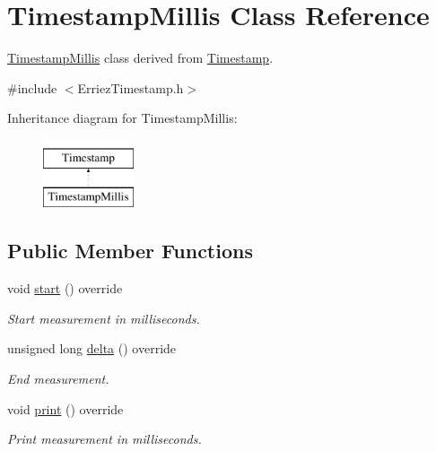 \hypertarget{class_timestamp_millis}{}\section{Timestamp\+Millis Class Reference}
\label{class_timestamp_millis}


\hyperlink{class_timestamp_millis}{Timestamp\+Millis} class derived from \hyperlink{class_timestamp}{Timestamp}.  




{\ttfamily \#include $<$Erriez\+Timestamp.\+h$>$}

Inheritance diagram for Timestamp\+Millis\+:\begin{figure}[H]
\begin{center}
\leavevmode
\includegraphics[height=2.000000cm]{class_timestamp_millis}
\end{center}
\end{figure}
\subsection*{Public Member Functions}
\begin{DoxyCompactItemize}
\item 
void \hyperlink{class_timestamp_millis_a4865760b8d19a2cff0b230c8bf0123d2}{start} () override\hypertarget{class_timestamp_millis_a4865760b8d19a2cff0b230c8bf0123d2}{}\label{class_timestamp_millis_a4865760b8d19a2cff0b230c8bf0123d2}

\begin{DoxyCompactList}\small\item\em Start measurement in milliseconds. \end{DoxyCompactList}\item 
unsigned long \hyperlink{class_timestamp_millis_a30f095de20ba61a4367458a942bda0a4}{delta} () override
\begin{DoxyCompactList}\small\item\em End measurement. \end{DoxyCompactList}\item 
void \hyperlink{class_timestamp_millis_a6ba74353b6e503022ac75303d67fb666}{print} () override
\begin{DoxyCompactList}\small\item\em Print measurement in milliseconds. \end{DoxyCompactList}\end{DoxyCompactItemize}


